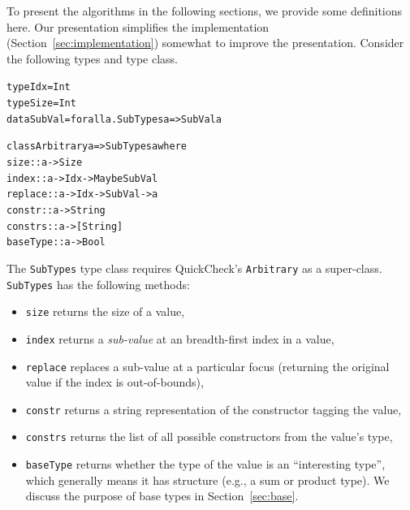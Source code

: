 \documentclass[10pt]{sigplanconf}
\newenvironment{code}{\begin{alltt}}{\end{alltt}}
\newcommand{\ttp}[1]{\texttt{#1}}
\begin{document}
To present the algorithms in the following sections, we provide some definitions
here.  Our presentation simplifies the implementation
(Section~\ref{sec:implementation}) somewhat to improve the presentation.
Consider the following types and type class.
%
\begin{code}
type Idx    = Int
type Size   = Int
data SubVal = forall a. SubTypes a => SubVal a

class Arbitrary a => SubTypes a where
  size     :: a -> Size
  index    :: a -> Idx -> Maybe SubVal
  replace  :: a -> Idx -> SubVal -> a
  constr   :: a -> String
  constrs  :: a -> [String]
  baseType :: a -> Bool
\end{code}
%
\noindent
The \ttp{SubTypes} type class requires QuickCheck's \ttp{Arbitrary} as a
super-class.  \ttp{SubTypes} has the following methods:
\begin{itemize}
\item \ttp{size} returns the size of a value,
\item \ttp{index} returns a \emph{sub-value} at an breadth-first index in a
  value,
\item \ttp{replace} replaces a sub-value at a particular focus (returning the
  original value if the index is out-of-bounds),
\item \ttp{constr} returns a string representation of the constructor tagging
  the value,
\item \ttp{constrs} returns the list of all possible constructors from the
  value's type,
\item \ttp{baseType} returns whether the type of the value is an ``interesting
  type'', which generally means it has structure (e.g., a sum or product type).
  We discuss the purpose of base types in Section~\ref{sec:base}.
\end{itemize}
\end{document}
